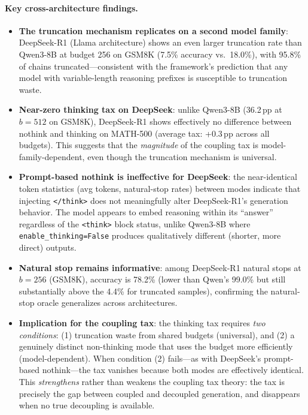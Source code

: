 \paragraph{Key cross-architecture findings.}
\begin{itemize}[nosep,leftmargin=*]
    \item \textbf{The truncation mechanism replicates on a second model family}: DeepSeek-R1
      (Llama architecture) shows an even larger truncation rate than Qwen3-8B at budget 256
      on GSM8K (7.5\% accuracy vs.\ 18.0\%), with 95.8\% of chains truncated---consistent with
      the framework's prediction that any model with variable-length reasoning prefixes
      is susceptible to truncation waste.
    \item \textbf{Near-zero thinking tax on DeepSeek}: unlike Qwen3-8B (36.2\,pp at $b{=}512$
      on GSM8K), DeepSeek-R1 shows effectively no difference between nothink and thinking
      on MATH-500 (average tax: +0.3\,pp across all budgets).
      This suggests that the \emph{magnitude} of the coupling tax is model-family-dependent,
      even though the truncation mechanism is universal.
    \item \textbf{Prompt-based nothink is ineffective for DeepSeek}: the near-identical
      token statistics (avg tokens, natural-stop rates) between modes indicate that
      injecting \texttt{</think>} does not meaningfully alter DeepSeek-R1's generation behavior.
      The model appears to embed reasoning within its ``answer'' regardless of the
      \texttt{<think>} block status, unlike Qwen3-8B where \texttt{enable\_thinking=False}
      produces qualitatively different (shorter, more direct) outputs.
    \item \textbf{Natural stop remains informative}: among DeepSeek-R1 natural
      stops at $b{=}256$ (GSM8K), accuracy is 78.2\% (lower than Qwen's 99.0\% but still
      substantially above the 4.4\% for truncated samples), confirming the
      natural-stop oracle generalizes across architectures.
    \item \textbf{Implication for the coupling tax}: the thinking tax requires
      \emph{two conditions}: (1) truncation waste from shared budgets (universal), and
      (2) a genuinely distinct non-thinking mode that uses the budget more efficiently
      (model-dependent). When condition (2) fails---as with DeepSeek's prompt-based
      nothink---the tax vanishes because both modes are effectively identical.
      This \emph{strengthens} rather than weakens the coupling tax theory: the tax is
      precisely the gap between coupled and decoupled generation, and disappears
      when no true decoupling is available.
\end{itemize}

